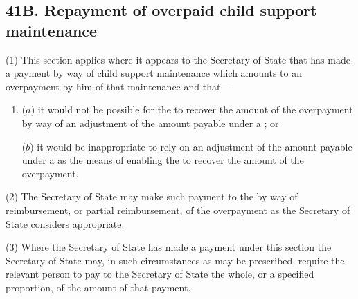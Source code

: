 \documentclass[12pt,a4paper]{article}
\begin{document}
\subsection{41B. Repayment of overpaid child support maintenance}

(1) This section applies where it appears to the Secretary of State that  has made a payment by way of child support maintenance which amounts to an overpayment by him of that maintenance and that---
\begin{enumerate}\item[]
($a$) it would not be possible for the  to recover the amount of the overpayment by way of an adjustment of the amount payable under a ; or

($b$) it would be inappropriate to rely on an adjustment of the amount payable under a  as the means of enabling the  to recover the amount of the overpayment.
\end{enumerate}


(2)
The Secretary of State may make such payment to the  by way of reimbursement, or partial reimbursement, of the overpayment as the Secretary of State considers appropriate.

(3)
Where the Secretary of State has made a payment under this section the Secretary of State may, in such circumstances as may be prescribed, require the relevant person to pay to the Secretary of State the whole, or a specified proportion, of the amount of that payment.
\end{document}

